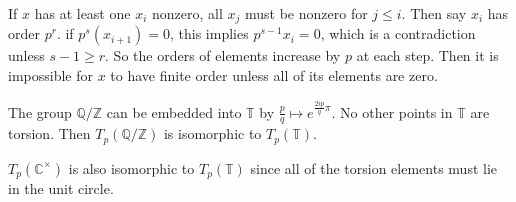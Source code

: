 \documentclass[11pt, reqno]{article}
\theoremstyle{plain}
\theoremstyle{definition}
\theoremstyle{remark}
\newcommand{\ZZ}{\mathbb{Z}}
\newcommand{\CC}{\mathbb{C}}
\newcommand{\QQ}{\mathbb{Q}}
\begin{document}
\begin{enumerate}
    If $x$ has at least one $x_i$ nonzero, all $x_j$ must be nonzero for $j \leq i$. Then say $x_i$ has order $p^r$. 
    if $p^s(x_{i+1}) = 0$, this implies $p^{s-1}x_i = 0$, which is a contradiction unless $s-1 \geq r$. So
    the orders of elements increase by $p$ at each step. Then it is impossible for $x$ to have finite order 
    unless all of its elements are zero. 

    The group $\QQ/\ZZ$ can be embedded into $\mathbb{T}$ by $\frac{p}{q} \mapsto e^{\frac{2ip}{q}\pi}$.
    No other points in $\mathbb{T}$ are torsion. Then $T_p(\QQ/\ZZ)$ is isomorphic to $T_p(\mathbb{T})$.

    $T_p(\CC^\times)$ is also isomorphic to $T_p(\mathbb{T})$ since all of the torsion elements must lie 
    in the unit circle. 

\end{enumerate}
\end{document}
